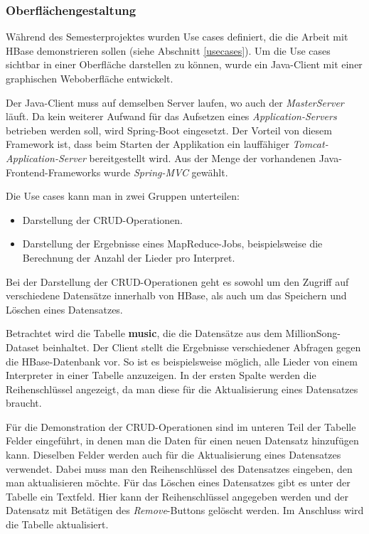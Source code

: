 \subsubsection{Oberflächengestaltung}

Während des Semesterprojektes wurden Use cases definiert, die die Arbeit mit  HBase demonstrieren sollen (siehe Abschnitt \ref{usecases}).
Um die Use cases sichtbar in einer Oberfläche darstellen zu können, wurde ein Java-Client mit einer graphischen Weboberfläche entwickelt.

Der Java-Client muss auf demselben Server laufen, wo auch der \textit{MasterServer} läuft. Da kein weiterer Aufwand für das Aufsetzen eines \textit{Application-Servers} betrieben werden soll, wird Spring-Boot eingesetzt. Der Vorteil von diesem Framework ist, dass beim Starten der Applikation ein lauffähiger \textit{Tomcat-Application-Server} bereitgestellt wird. 
Aus der Menge der vorhandenen Java-Frontend-Frameworks wurde \textit{Spring-MVC} gewählt.  

Die Use cases kann man in zwei Gruppen unterteilen:
\begin{itemize}
\item Darstellung der \ac{CRUD}-Operationen.
\item Darstellung der Ergebnisse eines MapReduce-Jobs, beispielsweise die Berechnung der Anzahl der Lieder pro Interpret.
\end{itemize}
Bei der Darstellung der \ac{CRUD}-Operationen geht es sowohl um den Zugriff auf verschiedene Datensätze innerhalb von HBase, als auch um das Speichern und Löschen eines Datensatzes.

Betrachtet wird die Tabelle \textbf{music}, die die Datensätze aus dem MillionSong-Dataset beinhaltet.
Der Client stellt die Ergebnisse verschiedener Abfragen gegen die HBase-Datenbank vor. So ist es beispielsweise möglich, alle Lieder von einem Interpreter in einer Tabelle anzuzeigen. In der ersten Spalte werden die Reihenschlüssel angezeigt, da man diese für die Aktualisierung eines Datensatzes braucht.

Für die Demonstration der \ac{CRUD}-Operationen sind im unteren Teil der Tabelle Felder eingeführt, in denen man die Daten für einen neuen Datensatz hinzufügen kann. Dieselben Felder werden auch für die Aktualisierung eines Datensatzes verwendet. Dabei muss man den Reihenschlüssel des Datensatzes eingeben, den man aktualisieren möchte.
Für das Löschen eines Datensatzes gibt es unter der Tabelle ein Textfeld. Hier kann der Reihenschlüssel angegeben werden und der Datensatz mit Betätigen des \textit{Remove}-Buttons gelöscht werden. Im Anschluss wird die Tabelle aktualisiert.

